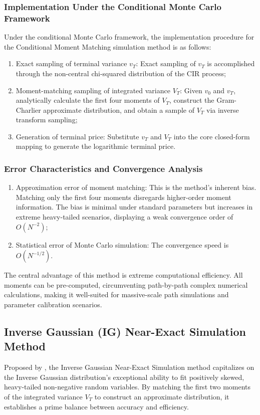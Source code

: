 \subsubsection{Implementation Under the Conditional Monte Carlo Framework}
Under the conditional Monte Carlo framework, the implementation procedure for the Conditional Moment Matching simulation method is as follows:
\begin{enumerate}
    \item Exact sampling of terminal variance $v_T$: Exact sampling of $v_T$ is accomplished through the non-central chi-squared distribution of the CIR process;

    \item Moment-matching sampling of integrated variance $V_T$: Given $v_0$ and $v_T$, analytically calculate the first four moments of $V_T$, construct the Gram-Charlier approximate distribution, and obtain a sample of $V_T$ via inverse transform sampling;

    \item Generation of terminal price: Substitute $v_T$ and $V_T$ into the core closed-form mapping to generate the logarithmic terminal price.
\end{enumerate}

\subsubsection{Error Characteristics and Convergence Analysis}
\begin{enumerate}
    \item Approximation error of moment matching: This is the method's inherent bias. Matching only the first four moments disregards higher-order moment information. The bias is minimal under standard parameters but increases in extreme heavy-tailed scenarios, displaying a weak convergence order of $O(N^{-2})$;

    \item Statistical error of Monte Carlo simulation: The convergence speed is $O(N^{-1/2})$.
\end{enumerate}
The central advantage of this method is extreme computational efficiency. All moments can be pre-computed, circumventing path-by-path complex numerical calculations, making it well-suited for massive-scale path simulations and parameter calibration scenarios.

\subsection{Inverse Gaussian (IG) Near-Exact Simulation Method}
Proposed by \citet{choiSimulationSchemesHeston2024}, the Inverse Gaussian Near-Exact Simulation method capitalizes on the Inverse Gaussian distribution's exceptional ability to fit positively skewed, heavy-tailed non-negative random variables. By matching the first two moments of the integrated variance $V_T$ to construct an approximate distribution, it establishes a prime balance between accuracy and efficiency.

